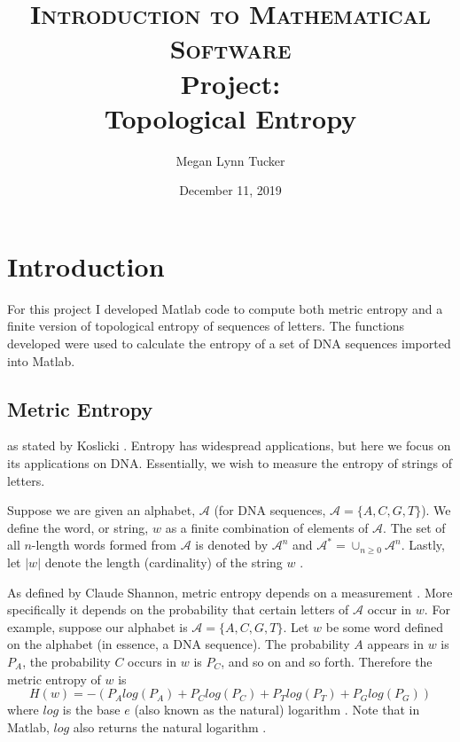\documentclass{article}
\title{
\normalfont \normalsize 
\textsc{Introduction to Mathematical Software} \\ [20pt]
\huge Project: \\ Topological Entropy
}
\author{Megan Lynn Tucker}
\date{December 11, 2019}
\begin{document}

\maketitle

\section{Introduction}
For this project I developed Matlab code to compute both metric entropy and a finite version of topological entropy of sequences of letters.
The functions developed were used to calculate the entropy of a set of DNA sequences imported into Matlab.

\subsection{Metric Entropy}
 as stated by Koslicki \cite{1}.
Entropy has widespread applications, but here we focus on its applications on DNA.
Essentially, we wish to measure the entropy of strings of letters.

Suppose we are given an alphabet, $\mathcal{A}$ (for DNA sequences, $\mathcal{A} = \{A, C, G, T\}$).
We define the word, or string, $w$ as a finite combination of elements of $\mathcal{A}$.
The set of all $n$-length words formed from $\mathcal{A}$ is denoted by $\mathcal{A}^n$ and $\mathcal{A}^* = \cup_{n \geq 0} \mathcal{A}^n$.
Lastly, let $|w|$ denote the length (cardinality) of the string $w$ \cite{1}.

As defined by Claude Shannon, metric entropy depends on a measurement \cite{2}.
More specifically it depends on the probability that certain letters of $\mathcal{A}$ occur in $w$.
For example, suppose our alphabet is $\mathcal{A} = \{A, C, G, T\}$.
Let  $w$ be some word defined on the alphabet (in essence, a DNA sequence).
The probability $A$ appears in $w$ is $P_A$, the probability $C$ occurs in $w$ is $P_C$, and so on and so forth. 
Therefore the metric entropy of $w$ is
\begin{equation*}
    H(w) = -(P_Alog(P_A) + P_Clog(P_C) + P_Tlog(P_T) + P_Glog(P_G))
\end{equation*}
where $log$ is the base $e$ (also known as the natural) logarithm \cite{1}.
Note that in Matlab, $log$ also returns the natural logarithm \cite{4}. 
\end{document}
